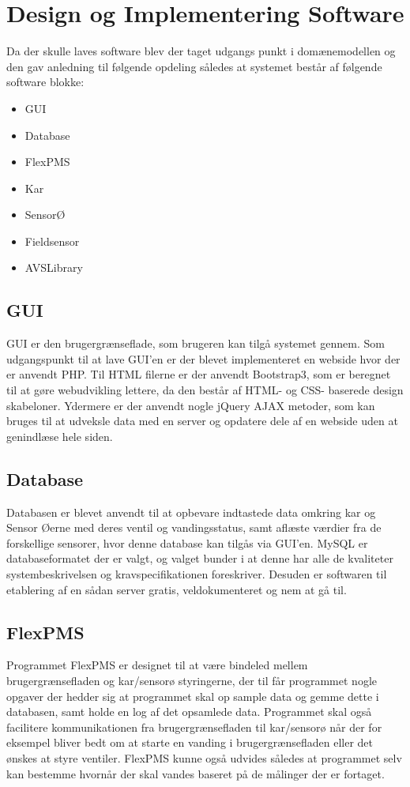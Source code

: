 \section{Design og Implementering Software}
Da der skulle laves software blev der taget udgangs punkt i domænemodellen og den gav anledning til følgende opdeling således at
systemet består af følgende software blokke:
\begin{itemize}
\item GUI
\item Database
\item FlexPMS
\item Kar
\item SensorØ
\item Fieldsensor
\item AVSLibrary
\end{itemize}

\subsection{GUI}
GUI er den brugergrænseflade, som brugeren kan tilgå systemet gennem. Som udgangspunkt til at lave GUI'en er der blevet implementeret en webside hvor der er anvendt PHP. Til HTML filerne er der anvendt Bootstrap3, som er beregnet til at gøre webudvikling lettere, da den består af HTML- og CSS- baserede design skabeloner. Ydermere er der anvendt nogle jQuery AJAX metoder, som kan bruges til at udveksle data med en server og opdatere dele af en webside uden at genindlæse hele siden.

\subsection{Database}
Databasen er blevet anvendt til at opbevare indtastede data omkring kar og Sensor Øerne med deres ventil og vandingsstatus, samt aflæste værdier fra de forskellige sensorer, hvor denne database kan tilgås via GUI'en. MySQL er databaseformatet der er valgt, og valget bunder i at denne har alle de kvaliteter systembeskrivelsen og kravspecifikationen foreskriver. Desuden er softwaren til etablering af en sådan server gratis, veldokumenteret og nem at gå til.

\subsection{FlexPMS}
Programmet FlexPMS er designet til at være bindeled mellem brugergrænsefladen og kar/sensorø
styringerne, der til får programmet nogle opgaver der hedder sig at programmet skal op sample
data og gemme dette i databasen, samt holde en log af det opsamlede data. Programmet skal også
facilitere kommunikationen fra brugergrænsefladen til kar/sensorø når der for eksempel bliver bedt
om at starte en vanding i brugergrænsefladen eller det ønskes at styre ventiler. FlexPMS kunne
også udvides således at programmet selv kan bestemme hvornår der skal vandes baseret på de
målinger der er fortaget.

